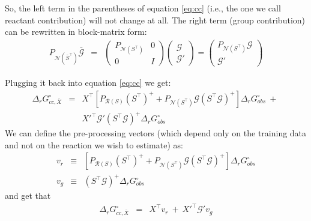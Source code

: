 \documentclass{article}
\newcommand{\Gmat}{\mathcal{G}}
\newcommand{\PRmat}[1]{P_{\mathcal{R}\left(#1\right)}}
\newcommand{\PNmat}[1]{P_{\mathcal{N}\left(#1\right)}}
\begin{document}
So, the left term in the parentheses of equation \ref{eq:cc} (i.e., the one we call reactant contribution) will not change at all. The right term (group contribution) can be rewritten in block-matrix form:
\begin{eqnarray}\label{eq:P_N_ST_G}
\PNmat{\bar{S}^\top} \bar{\Gmat} &=& 
\left( \begin{array}{c|c} \PNmat{S^\top} & 0 \\ \hline 0 & I \end{array} \right)
\left( \begin{array}{c} \Gmat \\ \hline \Gmat'\end{array} \right)
 = \left( \begin{array}{c} \PNmat{S^\top} \Gmat \\ \hline \Gmat' \end{array} \right)
\end{eqnarray}

Plugging it back into equation \ref{eq:cc} we get:
\begin{eqnarray}
\Delta_{r}G_{cc,\bar{X}}^{\circ} &=& 
    X^\top \left[
	\PRmat{S} \left(S^{\top}\right)^{+} +
	\PNmat{S^\top} \Gmat  \left(S^{\top}\Gmat\right)^{+} \right]\Delta_{r}G_{obs}^{\circ} ~+~ \nonumber\\ && 
	X'^\top \Gmat' \left(S^{\top}\Gmat\right)^{+} \Delta_{r}G_{obs}^{\circ}
\end{eqnarray}
We can define the pre-processing vectors (which depend only on the training data and not on the reaction we wish to estimate) as:
\begin{eqnarray}
	v_{r} &\equiv&
	\left[
		\PRmat{S} \left(S^{\top}\right)^{+} + 
		\PNmat{S^\top} \Gmat \left(S^{\top}\Gmat\right)^{+}
	\right]
	\Delta_{r}G_{obs}^{\circ}
\\
	v_g &\equiv& \left(S^{\top}\Gmat\right)^{+} \Delta_{r}G_{obs}^{\circ}
\end{eqnarray}
and get that
\begin{eqnarray}
\Delta_{r}G_{cc,\bar{X}}^{\circ} &=& X^\top v_r ~+~ X'^\top \Gmat' v_g
\end{eqnarray}
\end{document}
